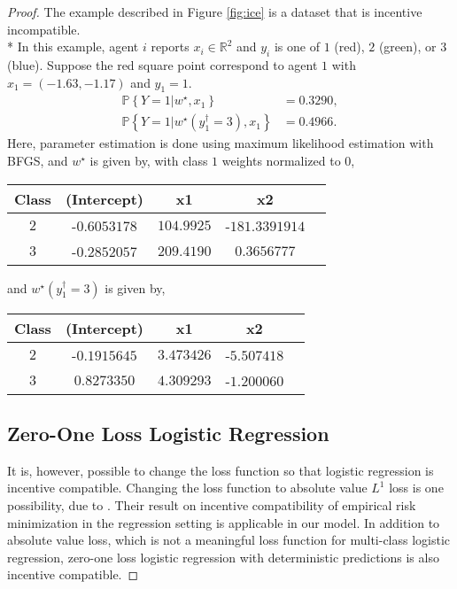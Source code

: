 \documentclass{article}
\begin{document}
\begin{proof} \label{proof:logitpf} 
The example described in Figure \ref{fig:ice} is a dataset that is incentive incompatible.
\\* In this example, agent $i $ reports $x_{i} \in \mathbb{R}^{2}$ and $y_{i}$ is one of $1$ (red), $2$ (green), or $3$ (blue). Suppose the red square point correspond to agent $1$ with $x_{1} = \left(-1.63, -1.17\right)$ and $y_{1} = 1$.
\begin{align*}
\mathbb{P}\left\{Y = 1 | w^\star , x_{1}\right\} &= 0.3290,
\\ \mathbb{P}\left\{Y = 1 | w^\star \left(y^{\dagger}_{1} = 3\right), x_{1}\right\} &= 0.4966.
\end{align*}
Here, parameter estimation is done using maximum likelihood estimation with BFGS, and $w^\star $ is given by, with class $1$ weights normalized to $0$,

\begin{center} \begin{tabular}{|c|c|c|c|c|}
\hline
 Class &(Intercept) &x1 &x2\\ \hline
$2$ &-$0.6053178$ &$104.9925$ &-$181.3391914$\\ \hline
$3$ &-$0.2852057$ &$209.4190$ &$0.3656777$\\ \hline
\end{tabular} \end{center}
and $w^\star \left(y^{\dagger}_{1} = 3\right)$ is given by,

\begin{center} \begin{tabular}{|c|c|c|c|c|}
\hline
 Class &(Intercept) &x1 &x2\\ \hline
$2$ &-$0.1915645$ &$3.473426$ &-$5.507418$\\ \hline
$3$ &$0.8273350$ &$4.309293$ &-$1.200060$\\ \hline
\end{tabular} \end{center}


\subsection{Zero-One Loss Logistic Regression}
It is, however, possible to change the loss function so that logistic regression is incentive compatible. Changing the loss function to absolute value $L^{1}$ loss is one possibility, due to \citet*{dekel2010incentive}. Their result on incentive compatibility of empirical risk minimization in the regression setting is applicable in our model. In addition to absolute value loss, which is not a meaningful loss function for multi-class logistic regression, zero-one loss logistic regression with deterministic predictions is also incentive compatible.
\newline \newline\end{proof}
\end{document}
